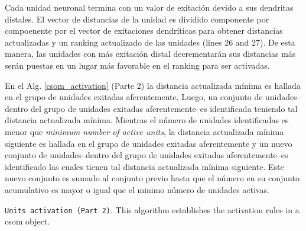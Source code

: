 {Cada unidad neuronal termina con un valor de exitación devido a sus dendritas distales. El vector de distancias de la unidad es dividido componente por compoenente por el vector de exitaciones dendríticas para obtener distancias actualizadas y un ranking actualizado de las unidades (lines 26 and 27). De esta manera, las unidades con más exitación distal decrementarán sus distancias más serán puestas en un lugar más favorable en el ranking para ser activadas.

En el Alg. \ref{csom_activation} (Parte 2) la distancia actualizada mínima es hallada en el grupo de unidades exitadas aferentemente. Luego, un conjunto de unidades--dentro del grupo de unidades exitadas aferentemente--es identificada teniendo tal distancia actualizada mínima. Mientras el número de unidades identificadas es menor que \emph{minimum number of active units}, la distancia actualizada mínima siguiente es hallada en el grupo de unidades exitadas aferentemente y un nuevo conjunto de unidades--dentro del grupo de unidades exitadas aferentemente--es identificado las cuales tienen tal distancia actualizada mínima siguiente.
Este nuevo conjunto es sumado al conjunto previo hasta que el número en su conjunto acumulativo es mayor o igual que el minimo número de unidades activas.

\begin{algorithm}
\ContinuedFloat
\caption{\texttt{Units activation (Part 2)}. This algorithm establishes the activation rules in a \gls{csom} object.}
\label{csom_activation}
\begin{algorithmic}[1]

	\ENDWHILE


\end{algorithmic}
\end{algorithm}}
